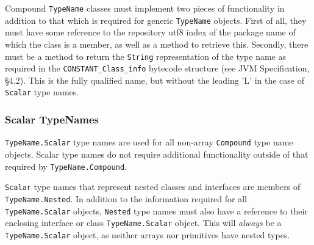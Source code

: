 \documentclass{report}
\begin{document}
Compound \texttt{TypeName} classes 
must implement two pieces of functionality
in addition to that which is required for generic \texttt{TypeName} objects. 
First of all, they must have some reference to the repository utf8 index of the
package name of which the class is a member, as well as a method to retrieve 
this. Secondly, there must be a method to return the \texttt{String} 
representation of the type name as required in the 
\texttt{CONSTANT\_Class\_info} bytecode structure (see JVM Specification, 
\S 4.2). This is the fully qualified name, but without the leading 'L' in the 
case of \texttt{Scalar} type names.




\subsubsection{Scalar TypeNames}


\texttt{TypeName.Scalar} type names are used for all non-array 
\texttt{Compound} type name objects. Scalar type names do not require 
additional functionality outside of that required by 
\texttt{TypeName.Compound}.

\texttt{Scalar} type names that represent nested classes and interfaces are
members of \texttt{TypeName.Nested}. In addition to the information required
for all \texttt{TypeName.Scalar} objects, \texttt{Nested} type names must
also have a reference to their enclosing interface or class 
\texttt{TypeName.Scalar} object. This will {\em always} be a
\texttt{TypeName.Scalar} object, as neither arrays nor primitives have
nested types.
\end{document}
